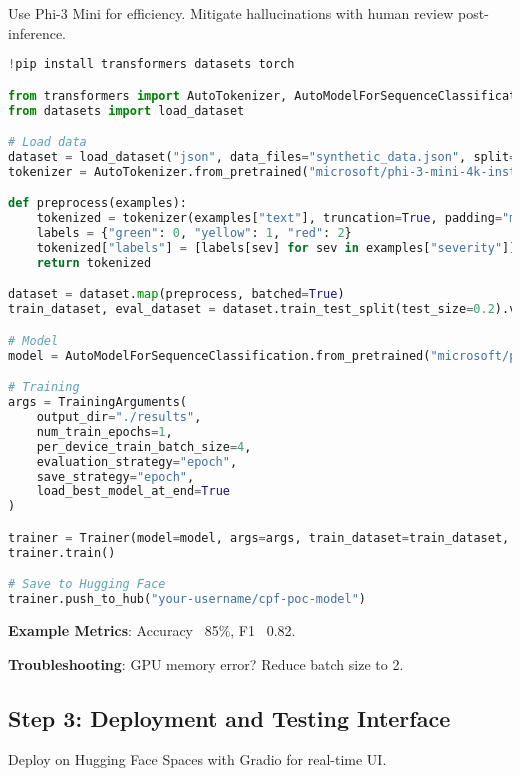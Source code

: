 \documentclass[11pt,a4paper]{article}
\begin{document}
Use Phi-3 Mini for efficiency. Mitigate hallucinations with human review post-inference.

\begin{lstlisting}[language=Python, caption=Model Fine-Tuning]
!pip install transformers datasets torch

from transformers import AutoTokenizer, AutoModelForSequenceClassification, Trainer, TrainingArguments
from datasets import load_dataset

# Load data
dataset = load_dataset("json", data_files="synthetic_data.json", split="train")
tokenizer = AutoTokenizer.from_pretrained("microsoft/phi-3-mini-4k-instruct")

def preprocess(examples):
    tokenized = tokenizer(examples["text"], truncation=True, padding="max_length", max_length=128)
    labels = {"green": 0, "yellow": 1, "red": 2}
    tokenized["labels"] = [labels[sev] for sev in examples["severity"]]
    return tokenized

dataset = dataset.map(preprocess, batched=True)
train_dataset, eval_dataset = dataset.train_test_split(test_size=0.2).values()

# Model
model = AutoModelForSequenceClassification.from_pretrained("microsoft/phi-3-mini-4k-instruct", num_labels=3)

# Training
args = TrainingArguments(
    output_dir="./results",
    num_train_epochs=1,
    per_device_train_batch_size=4,
    evaluation_strategy="epoch",
    save_strategy="epoch",
    load_best_model_at_end=True
)

trainer = Trainer(model=model, args=args, train_dataset=train_dataset, eval_dataset=eval_dataset)
trainer.train()

# Save to Hugging Face
trainer.push_to_hub("your-username/cpf-poc-model")
\end{lstlisting}

\textbf{Example Metrics}: Accuracy ~85\%, F1 ~0.82.

\textbf{Troubleshooting}: GPU memory error? Reduce batch size to 2.

\subsection{Step 3: Deployment and Testing Interface}

Deploy on Hugging Face Spaces with Gradio for real-time UI.
\end{document}
